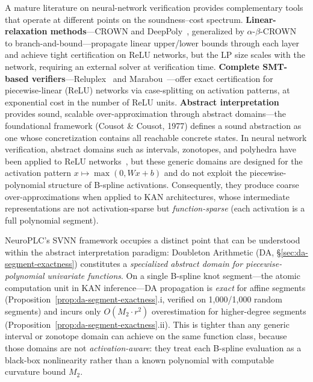 \documentclass[journal,onecolumn]{IEEEtran}
\newcommand{\neuroplc}{NeuroPLC\xspace}
\begin{document}
A mature literature on neural-network verification provides complementary
tools that operate at different points on the soundness--cost spectrum.
\textbf{Linear-relaxation methods}---CROWN and DeepPoly~\cite{zhang2018crown,
singh2019abstract}, generalized by $\alpha$-$\beta$-CROWN~\cite{wang2021beta}
to branch-and-bound---propagate linear upper/lower bounds through each layer
and achieve tight certification on ReLU networks, but the LP size scales with
the network, requiring an external solver at verification time.
\textbf{Complete SMT-based verifiers}---Reluplex~\cite{katz2017reluplex}
and Marabou~\cite{katz2019marabou}---offer exact certification for
piecewise-linear (ReLU) networks via case-splitting on activation patterns,
at exponential cost in the number of ReLU units.
\textbf{Abstract interpretation}~\cite{cousot1977abstract,
mirman2018differentiable, gowal2018scalable} provides sound, scalable
over-approximation through abstract domains---the foundational framework
(Cousot \& Cousot, 1977) defines a sound abstraction as one whose
concretization contains all reachable concrete states. In neural network
verification, abstract domains such as intervals, zonotopes, and
polyhedra have been applied to ReLU networks~\cite{mirman2018differentiable,
gowal2018scalable, singh2019abstract}, but these generic domains are
designed for the activation pattern $x \mapsto \max(0, Wx+b)$ and do not
exploit the piecewise-polynomial structure of B-spline activations.
Consequently, they produce coarse over-approximations when applied to
KAN architectures, whose intermediate representations are not
activation-sparse but \emph{function-sparse} (each activation is a full
polynomial segment).

\neuroplc's SVNN framework occupies a distinct point that can be
understood within the abstract interpretation paradigm: Doubleton
Arithmetic (DA, {\S}\ref{sec:da-segment-exactness}) constitutes a
\textit{specialized abstract domain for piecewise-polynomial univariate
functions}. On a single B-spline knot segment---the atomic computation
unit in KAN inference---DA propagation is \emph{exact} for affine segments
(Proposition~\ref{prop:da-segment-exactness}.i, verified on 1{,}000/1{,}000
random segments) and incurs only $O(M_2 \cdot r^2)$ overestimation for
higher-degree segments (Proposition~\ref{prop:da-segment-exactness}.ii).
This is tighter than any generic interval or zonotope domain can achieve
on the same function class, because those domains are not
\textit{activation-aware}: they treat each B-spline evaluation as a
black-box nonlinearity rather than a known polynomial with computable
curvature bound $M_2$.
\end{document}
